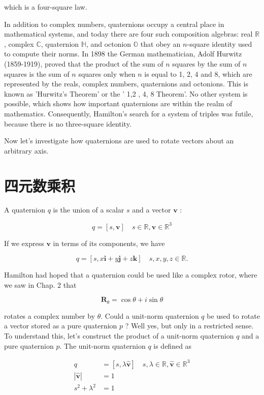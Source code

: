 which is a four-square law.

In addition to complex numbers, quaternions occupy a central place in mathematical systems, and today there are four such composition algebras: real $\mathbb{R}$, complex $\mathbb{C}$, quaternion $\mathbb{H}$, and octonion $\mathbb{O}$ that obey an $n$-square identity used to compute their norms. In 1898 the German mathematician, Adolf Hurwitz (1859-1919), proved that the product of the sum of $n$ squares by the sum of $n$ squares is the sum of $n$ squares only when $n$ is equal to 1, 2, 4 and 8, which are represented by the reals, complex numbers, quaternions and octonions. This is known as 'Hurwitz's Theorem' or the ' 1,2 , 4, 8 Theorem'. No other system is possible, which shows how important quaternions are within the realm of mathematics. Consequently, Hamilton's search for a system of triples was futile, because there is no three-square identity.

Now let's investigate how quaternions are used to rotate vectors about an arbitrary axis.

\section{四元数乘积}
A quaternion $q$ is the union of a scalar $s$ and a vector $\mathbf{v}$ :

$$
q=[s, \mathbf{v}] \quad s \in \mathbb{R}, \mathbf{v} \in \mathbb{R}^{3}
$$

If we express $\mathbf{v}$ in terms of its components, we have

$$
q=[s, x \mathbf{i}+y \mathbf{j}+z \mathbf{k}] \quad s, x, y, z \in \mathbb{R} .
$$

Hamilton had hoped that a quaternion could be used like a complex rotor, where we saw in Chap. 2 that

$$
\mathbf{R}_{\theta}=\cos \theta+i \sin \theta
$$

rotates a complex number by $\theta$. Could a unit-norm quaternion $q$ be used to rotate a vector stored as a pure quaternion $p$ ? Well yes, but only in a restricted sense. To understand this, let's construct the product of a unit-norm quaternion $q$ and a pure quaternion $p$. The unit-norm quaternion $q$ is defined as

$$
\begin{aligned}
q & =[s, \lambda \hat{\mathbf{v}}] \quad s, \lambda \in \mathbb{R}, \hat{\mathbf{v}} \in \mathbb{R}^{3} \\
|\hat{\mathbf{v}}| & =1 \\
s^{2}+\lambda^{2} & =1
\end{aligned}
$$

